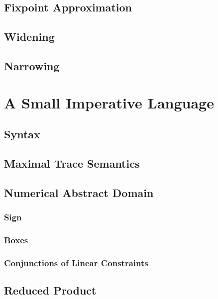 \subsection{Fixpoint Approximation}

\subsection{Widening}

\subsection{Narrowing}


\section{A Small Imperative Language}

\subsection{Syntax}

\subsection{Maximal Trace Semantics}

\subsection{Numerical Abstract Domain}

\subsubsection*{Sign}

\subsubsection*{Boxes}

\subsubsection*{Conjunctions of Linear Constraints}

\subsection{Reduced Product}


